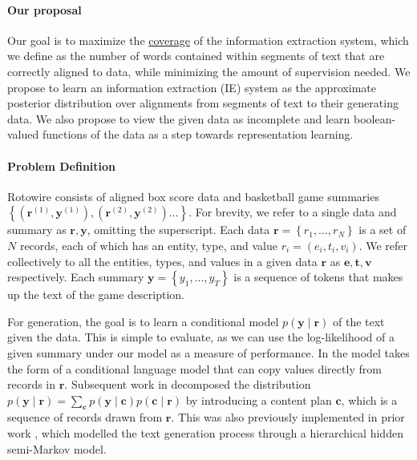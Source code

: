 \documentclass[11pt]{article}
\newcommand\set[1]{\left\{#1\right\}}
\newcommand{\bc}{\mathbf{c}}
\newcommand{\be}{\mathbf{e}}
\newcommand{\br}{\mathbf{r}}
\newcommand{\bt}{\mathbf{t}}
\newcommand{\bv}{\mathbf{v}}
\newcommand{\by}{\mathbf{y}}
\begin{document}
\paragraph{Our proposal}
Our goal is to maximize the \underline{coverage} of the information extraction system,
which we define as the number of words contained within segments of text that are correctly aligned to data,
while minimizing the amount of supervision needed.
We propose to learn an information extraction (IE) system as the approximate posterior distribution over 
alignments from segments of text to their generating data.
We also propose to view the given data as incomplete
and learn boolean-valued functions of the data as a step
towards representation learning.

\paragraph{Problem Definition}
\begin{comment}
\item Define notation
\item Define generation, mention sam and puduppully work.
\item Define extraction and its subtasks, mention regina and percy's work.
\item TODO: maybe combine align and values? Although I prefer to keep them separate
since values will probably turn into fill in the away team's values given home team's
\end{comment}
Rotowire consists of aligned box score data and basketball game summaries
$\set{(\br^{(1)}, \by^{(1)}),(\br^{(2)},\by^{(2)})\ldots}$.
For brevity, we refer to a single data and summary as $\br,\by$, omitting the superscript.
Each data $\br = \set{r_1,\ldots,r_N}$ is a set of $N$ records, each of which has
an entity, type, and value $r_i = (e_i, t_i, v_i)$.
We refer collectively to all the entities, types, and values in a given data $\br$ as
$\be,\bt,\bv$ respectively.
Each summary $\by = \set{y_1,\ldots,y_T}$ is a sequence of tokens that makes up the
text of the game description.

For generation, the goal is to learn a conditional model $p(\by\mid\br)$ of the text given the data.
This is simple to evaluate, as we can use the log-likelihood of a given summary under our model
as a measure of performance.
In \citet{wiseman2017d2t} the model takes the form of a conditional language model
that can copy values directly from records in $\br$.
Subsequent work in \citet{puduppully2018contentselection} decomposed the distribution 
$p(\by\mid\br) = \sum_{\bc}p(\by\mid\bc)p(\bc\mid\br)$
by introducing a content plan $\bc$, which is a sequence of records drawn from $\br$.
This was also previously implemented in prior work \citep{liang2009semalign},
which modelled the text generation process through a hierarchical hidden semi-Markov model.
\end{document}
